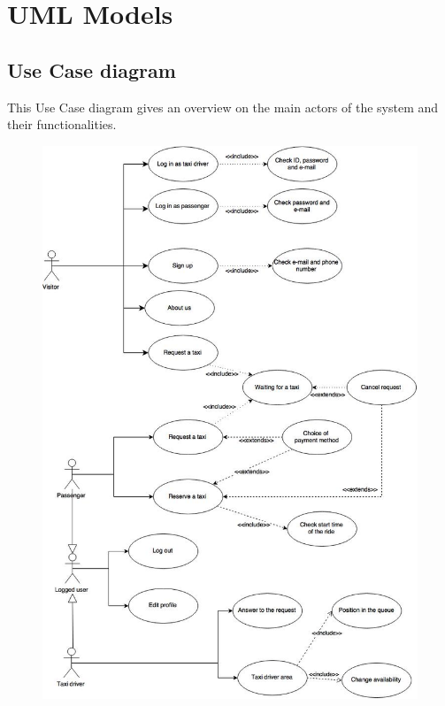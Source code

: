 \documentclass[18pt,oneside,a4paper, titlepage]{article}
\begin{document}
\section{UML Models}
	\subsection{Use Case diagram}
	This Use Case diagram gives an overview on the main actors of the system and their functionalities.
	\\
	\begin{figure}[h]
		\centering
		\includegraphics[scale=0.4]{UseCase2.jpg}
		
	\end{figure}
\newpage
\end{document}
